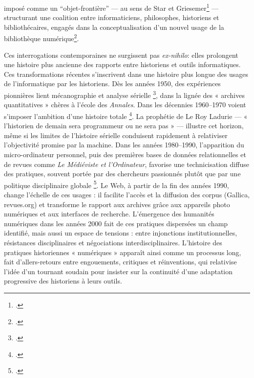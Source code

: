 imposé comme un \enquote{objet-frontière} — au sens de Star et Griesemer\footcite[][]{trompette} — structurant une coalition entre informaticiens, philosophes, historiens et bibliothécaires, engagés dans la conceptualisation d’un nouvel usage de la bibliothèque numérique\footcite[][]{bequet}.

Ces interrogations contemporaines ne surgissent pas \emph{ex-nihilo}: elles prolongent une histoire plus ancienne des rapports entre historiens et outils informatiques. Ces transformations récentes s’inscrivent dans une histoire plus longue des usages de l’informatique par les historiens. Dès les années 1950, des expériences pionnières lient mécanographie et analyse sérielle \footcite[][]{daumard}, dans la lignée des « archives quantitatives » chères à l’école des \emph{Annales}. Dans les décennies 1960–1970 voient s’imposer l’ambition d’une histoire totale \footcite[][]{poublanc}. La prophétie de Le Roy Ladurie — « l’historien de demain sera programmeur ou ne sera pas » — illustre cet horizon, même si les limites de l’histoire sérielle conduisent rapidement à relativiser l’objectivité promise par la machine. Dans les années 1980–1990, l’apparition du micro-ordinateur personnel, puis des premières bases de données relationnelles et de revues comme \emph{Le Médiéviste et l’Ordinateur}, favorise une technicisation diffuse des pratiques, souvent portée par des chercheurs passionnés plutôt que par une politique disciplinaire globale \footcite[][]{poublanc}. Le Web, à partir de la fin des années 1990, change l’échelle de ces usages : il facilite l’accès et la diffusion des corpus (Gallica, revues.org) et transforme le rapport aux archives grâce aux appareils photo numériques et aux interfaces de recherche. L’émergence des humanités numériques dans les années 2000 fait de ces pratiques dispersées un champ identifié, mais aussi un espace de tensions : entre injonctions institutionnelles, résistances disciplinaires et négociations interdisciplinaires. L’histoire des pratiques historiennes « numériques » apparaît ainsi comme un processus long, fait d’allers-retours entre engouements, critiques et réinventions, qui relativise l’idée d’un tournant soudain pour insister sur la continuité d’une adaptation progressive des historiens à leurs outils.

